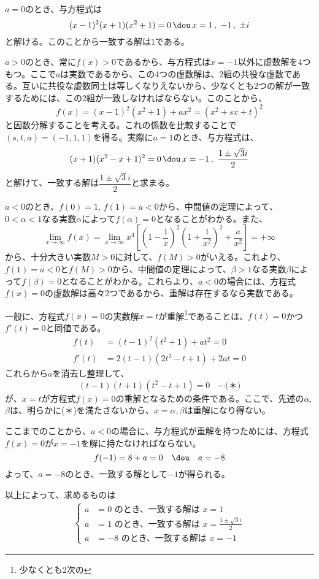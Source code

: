 $a=0$のとき、与方程式は
\[ (x-1)^2(x+1)(x^2+1)=0 \,\dou\, x=1 \,,\,\, -1 \,,\,\, \pm i \]
と解ける。このことから一致する解は$1$である。

$a>0$のとき、常に$f(x)>0$であるから、与方程式は$x=-1$以外に虚数解を4つもつ。ここで$a$は実数であるから、この4つの虚数解は、2組の共役な虚数である。互いに共役な虚数同士は等しくなりえないから、少なくとも2つの解が一致するためには、この2組が一致しなければならない。このことから、
\[ f(x)=(x-1)^2(x^2+1)+ax^2 = (x^2+sx+t)^2 \]
と因数分解することを考える。これの係数を比較することで$(s, t, a)=(-1, 1, 1)$を得る。実際に$a=1$のとき、与方程式は、
\[ (x+1)(x^2-x+1)^2=0 \,\dou\, x=-1\,,\,\, \frac{1\pm\sqrt{3}i}{2} \]
と解けて、一致する解は$\dfrac{1\pm\sqrt{3}i}{2}$と求まる。

$a<0$のとき、$f(0)=1$, $f(1)=a<0$から、中間値の定理によって、$0<\alpha<1$なる実数$\alpha$によって$f(\alpha)=0$となることがわかる。また、
\[\lim_{x\to\infty} f(x) = \lim_{x\to\infty} x^4\left[\left(1-\frac{1}{x}\right)^2\left(1+\frac{1}{x^2}\right)^2+\frac{a}{x^2}\right] =+\infty\]
から、十分大きい実数$M>0$に対して、$f(M)>0$がいえる。これより、$f(1)=a<0$と$f(M)>0$から、中間値の定理によって、$\beta>1$なる実数$\beta$によって$f(\beta)=0$となることがわかる。これらより、$a<0$の場合には、方程式$f(x)=0$の虚数解は高々2つであるから、重解は存在するなら実数である。

一般に、方程式$f(x)=0$の実数解$x=t$が重解\footnote{少なくとも2次の}であることは、$f(t)=0$かつ$f'(t)=0$と同値である。
\begin{align*}
 f(t)&=(t-1)^2(t^2+1)+at^2=0 \\
 f'(t)&=2(t-1)(2t^2-t+1)+2at=0
\end{align*}
これらから$a$を消去し整理して、
\[ (t-1)(t+1)(t^2-t+1)=0 \quad\cdots\text{(＊)}\]
が、$x=t$が方程式$f(x)=0$の重解となるための条件である。ここで、先述の$\alpha$, $\beta$は、明らかに(＊)を満たさないから、$x=\alpha, \beta$は重解になり得ない。

ここまでのことから、$a<0$の場合に、与方程式が重解を持つためには、方程式$f(x)=0$が$x=-1$を解に持たなければならない。
\[ f(-1)=8+a=0 \quad\dou\quad a=-8 \]
よって、$a=-8$のとき、一致する解として$-1$が得られる。

以上によって、求めるものは
\begin{align*}
 \left\{
 \begin{aligned}
  a&=0\,\,\text{のとき、一致する解は}\,\, x=1 \\
  a&=1\,\,\text{のとき、一致する解は}\,\, x=\frac{1\pm\sqrt{3}i}{2} \\
  a&=-8\,\,\text{のとき、一致する解は}\,\, x=-1
 \end{aligned}
 \right.
\end{align*}